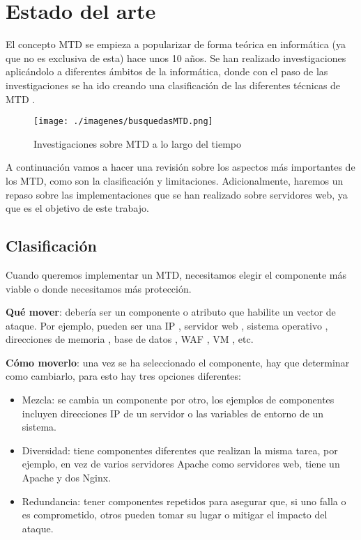 \chapter{Estado del arte}

El concepto MTD se empieza a popularizar de forma teórica en informática (ya que no es exclusiva de esta) hace unos 10 años. Se han realizado investigaciones aplicándolo a diferentes ámbitos de la informática, donde con el paso de las investigaciones se ha ido creando una clasificación de las diferentes técnicas de MTD \cite{big-state-of-art}.
\begin{figure}[h]
    \centering
    \texttt{[image: ./imagenes/busquedasMTD.png]}
    \caption{Investigaciones sobre MTD a lo largo del tiempo\cite{mtd-results}}
\end{figure}

A continuación vamos a hacer una revisión sobre los aspectos más importantes de los MTD, como son la clasificación y limitaciones. Adicionalmente, haremos un repaso sobre las implementaciones que se han realizado sobre servidores web, ya que es el objetivo de este trabajo.

\section{Clasificación}
Cuando queremos implementar un MTD, necesitamos elegir el componente más viable o donde necesitamos más protección.

\textbf{Qué mover}: debería ser un componente o atributo que habilite un vector de ataque. Por ejemplo, pueden ser una IP \cite{MTD-SDN+decoy}\cite{MTD-ipshuffling+honeypots}\cite{MTD-POC-empresa}, servidor web \cite{MTD-DARE}\cite{MTD-MORE+DARE+Java}, sistema operativo \cite{MTD-MORE+DARE+Java}, direcciones de memoria \cite{MTD-ASR}, base de datos \cite{MTD-arab}, WAF \cite{MTD-WAF}, VM \cite{MTD-POC-empresa}\cite{MTD-DARE}\cite{SCIT-base}, etc.

\textbf{Cómo moverlo}: una vez se ha seleccionado el componente, hay que determinar como cambiarlo, para esto hay tres opciones diferentes:
\begin{itemize}
    \item Mezcla: se cambia un componente por otro, los ejemplos de componentes incluyen direcciones IP de un servidor o las variables de entorno de un sistema.
    \item Diversidad: tiene componentes diferentes que realizan la misma tarea, por ejemplo, en vez de varios servidores Apache como servidores web, tiene un Apache y dos Nginx.
    \item Redundancia: tener componentes repetidos para asegurar que, si uno falla o es comprometido, otros pueden tomar su lugar o mitigar el impacto del ataque. 
\end{itemize}

